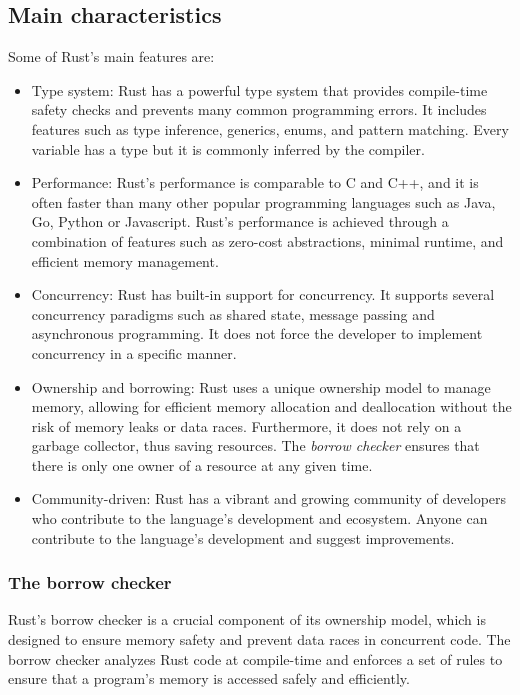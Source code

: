 \subsection{Main characteristics}

Some of Rust's main features are:

\begin{itemize}
    \item Type system: Rust has a powerful type system that provides compile-time safety checks and prevents many common programming errors.
          It includes features such as type inference, generics, enums, and pattern matching.
          Every variable has a type but it is commonly inferred by the compiler.
    \item Performance: Rust's performance is comparable to C and C++,
          and it is often faster than many other popular programming languages such as Java, Go, Python or Javascript.
          Rust's performance is achieved through a combination of features
          such as zero-cost abstractions, minimal runtime, and efficient memory management.
    \item Concurrency: Rust has built-in support for concurrency.
          It supports several concurrency paradigms such as shared state, message passing and asynchronous programming.
          It does not force the developer to implement concurrency in a specific manner.
    \item Ownership and borrowing: Rust uses a unique ownership model to manage memory,
          allowing for efficient memory allocation and deallocation without the risk of memory leaks or data races.
          Furthermore, it does not rely on a garbage collector, thus saving resources.
          The \emph{borrow checker} ensures that there is only one owner of a resource at any given time.
    \item Community-driven: Rust has a vibrant and growing community of developers
          who contribute to the language's development and ecosystem.
          Anyone can contribute to the language's development and suggest improvements.
\end{itemize}

\subsubsection{The borrow checker}

Rust's borrow checker is a crucial component of its ownership model,
which is designed to ensure memory safety and prevent data races in concurrent code.
The borrow checker analyzes Rust code at compile-time
and enforces a set of rules to ensure that a program's memory is accessed safely and efficiently.

